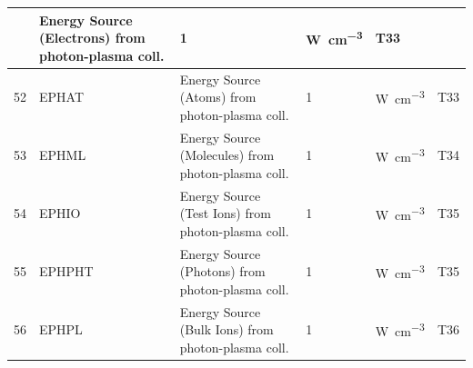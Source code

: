 \begin{landscape}
\begin{longtable}{|r|l|l|l|l|c|}
                                                                   & Energy Source (Electrons)
    from photon-plasma coll.
                                                                   & 1
                                                                   &
    \si{\watt\per\cubic\centi\metre}                               & T33
    \\  \hline
    52                                                             & EPHAT
                                                                   & Energy Source (Atoms)
    from photon-plasma coll.
                                                                   & 1
                                                                   &
    \si{\watt\per\cubic\centi\metre}                               & T33
    \\  \hline
    53                                                             & EPHML
                                                                   & Energy Source (Molecules)
    from photon-plasma coll.
                                                                   & 1
                                                                   &
    \si{\watt\per\cubic\centi\metre}                               & T34
    \\  \hline
    54                                                             & EPHIO
                                                                   & Energy Source (Test Ions)
    from photon-plasma coll.
                                                                   & 1
                                                                   &
    \si{\watt\per\cubic\centi\metre}                               & T35
    \\  \hline
    55                                                             & EPHPHT
                                                                   & Energy Source (Photons)
    from photon-plasma coll.
                                                                   & 1
                                                                   &
    \si{\watt\per\cubic\centi\metre}                               & T35
    \\  \hline
    56                                                             & EPHPL
                                                                   & Energy Source (Bulk Ions)
    from photon-plasma coll.
                                                                   & 1
                                                                   &
    \si{\watt\per\cubic\centi\metre}                               & T36

\end{longtable}
\end{landscape}

